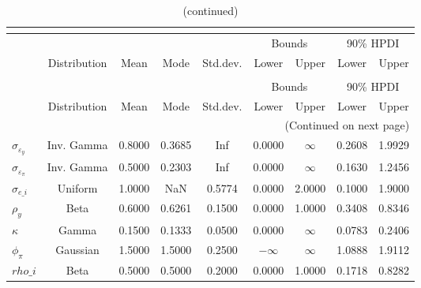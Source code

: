  
\begin{center}
\begin{longtable}{lcccccccc} 
\caption{Prior information (parameters)}\\
 \label{Table:Prior}\\
\toprule%
  &  &  &  &  & \multicolumn{2}{c}{Bounds} & \multicolumn{2}{c}{90\% HPDI} \\ 
  \cmidrule(r{.75em}){6-7} \cmidrule(r{.75em}){8-9}
  & Distribution & Mean & Mode & Std.dev. & Lower & Upper & Lower & Upper  \\ 
\midrule
\endfirsthead
\caption{(continued)}\\
 \toprule%
  &  &  &  &  & \multicolumn{2}{c}{Bounds} & \multicolumn{2}{c}{90\% HPDI} \\ 
  \cmidrule(r{.75em}){6-7} \cmidrule(r{.75em}){8-9}
  & Distribution & Mean & Mode & Std.dev. & Lower & Upper & Lower & Upper  \\ 
\midrule
\endhead
\midrule
\multicolumn{9}{r}{(Continued on next page)} \\ 
\bottomrule
\endfoot
\bottomrule
\endlastfoot
$ \sigma_{\varepsilon_y} $ & Inv. Gamma & 0.8000 & 0.3685 &    Inf & 0.0000 & $\infty$ & 0.2608 & 1.9929 \\ 
$ \sigma_{\varepsilon_\pi} $ & Inv. Gamma & 0.5000 & 0.2303 &    Inf & 0.0000 & $\infty$ & 0.1630 & 1.2456 \\ 
$ \sigma_{e\_i} $ & Uniform & 1.0000 & NaN & 0.5774 & 0.0000 & 2.0000 & 0.1000 & 1.9000 \\ 
$ \rho_y $ & Beta & 0.6000 & 0.6261 & 0.1500 & 0.0000 & 1.0000 & 0.3408 & 0.8346 \\ 
$ \kappa $ & Gamma & 0.1500 & 0.1333 & 0.0500 & 0.0000 & $\infty$ & 0.0783 & 0.2406 \\ 
$ \phi_\pi $ & Gaussian & 1.5000 & 1.5000 & 0.2500 & $-\infty$ & $\infty$ & 1.0888 & 1.9112 \\ 
$ rho\_i $ & Beta & 0.5000 & 0.5000 & 0.2000 & 0.0000 & 1.0000 & 0.1718 & 0.8282 \\ 
\end{longtable}
 \end{center}
